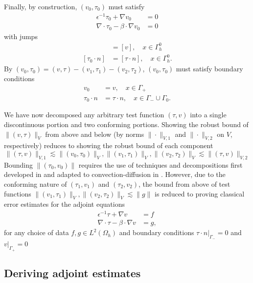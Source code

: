 \documentclass[11pt,onecolumn]{scrartcl}
\newcommand{\grad}{\nabla}
\renewcommand{\div}{\grad \cdot}
\begin{document}
Finally, by construction, $\left(v_0,\tau_0\right)$ must satisfy 
\begin{align*}
\epsilon^{-1}\tau_0 + \grad v_0 &= 0\\
\div \tau_0 - \beta\cdot \grad v_0 &= 0
\end{align*}
with jumps
\begin{align*}
[v_0] &= [v], \quad x\in \Gamma_h^0\\
[\tau_0 \cdot n] &= [\tau \cdot n], \quad x\in \Gamma_h^0.
\end{align*}
By $\left(v_0,\tau_0\right) = \left(v,\tau\right) - \left(v_1,\tau_1\right) - \left(v_2,\tau_2\right)$, $\left(v_0,\tau_0\right)$ must satisfy boundary conditions
\begin{align}
v_0 &= v, \quad x\in \Gamma_+ \label{bc_1}\\
\tau_0 \cdot n &= \tau \cdot n, \quad x\in \Gamma_-\cup \Gamma_0. \label{bc_2}
\end{align}

We have now decomposed any arbitrary test function $\left(\tau,v\right)$ into a single discontinuous portion and two conforming portions.  Showing the robust bound of $\|\left(v,\tau\right)\|_V$ from above and below (by norms $\|\cdot \|_{V,1}$ and $\|\cdot \|_{V,2}$ on $V$, respectively) reduces to showing the robust bound of each component 
\[
\|\left(\tau,v\right)\|_{V,1} \lesssim \|\left(v_{0},\tau_{0}\right)\|_V, \|\left(v_{1},\tau_{1}\right)\|_V, \|\left(v_{2},\tau_{2}\right)\|_V \lesssim \|\left(\tau,v\right)\|_{V,2}
\]
Bounding $\|\left(\tau_0,v_0\right)\|$ requires the use of techniques and decompositions first developed in \cite{analysisDPG} and adapted to convection-diffusion in \cite{DPGrobustness}.  However, due to the conforming nature of $\left(\tau_1,v_1\right)$ and $\left(\tau_2,v_2\right)$, the bound from above of test functions $\|\left(v_{1},\tau_{1}\right)\|_V, \|\left(v_{2},\tau_{2}\right)\|_V \lesssim \|g\|$ is reduced to proving classical error estimates for the adjoint equations
\begin{align}
\epsilon^{-1}\tau + \grad v &= f \label{adjoint1}\\
\div \tau - \beta\cdot \grad v &=  g, \label{adjoint2}
\end{align} 
for any choice of data $f, g\in L^2({\Omega_h})$ and boundary conditions $\left.\tau\cdot n\right|_{\Gamma_-} = 0$ and $\left.v\right|_{\Gamma_+} = 0$ 

\subsection{Deriving adjoint estimates}
\label{sec:strategy3}
\end{document}
